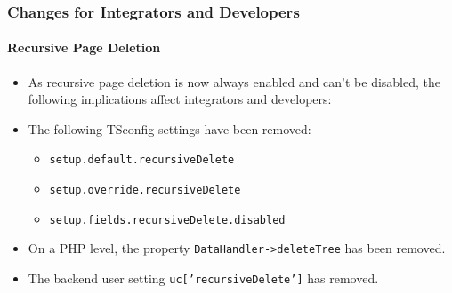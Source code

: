 %

\begin{frame}[fragile]
	\frametitle{Changes for Integrators and Developers}
	\framesubtitle{Recursive Page Deletion}

	\lstset{basicstyle=\tiny\ttfamily}

	\begin{itemize}
		\item As recursive page deletion is now always enabled and can't be disabled,
			the following implications affect integrators and developers:
		\item The following TSconfig settings have been removed:

			\begin{itemize}
				\item \texttt{setup.default.recursiveDelete}
				\item \texttt{setup.override.recursiveDelete}
				\item \texttt{setup.fields.recursiveDelete.disabled}
			\end{itemize}

		\item On a PHP level, the property \texttt{DataHandler->deleteTree} has been removed.
		\item The backend user setting \texttt{uc['recursiveDelete']} has removed.

	\end{itemize}

\end{frame}

